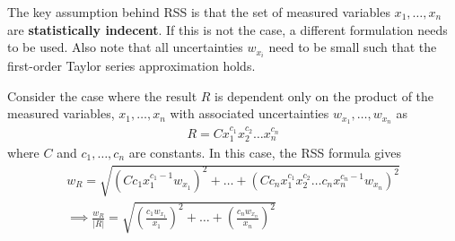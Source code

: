 The key assumption behind RSS is that the set of measured variables $x_1, \ldots, x_n$ are \textbf{statistically indecent}. If this is not the case, a different formulation needs to be used. Also note that all uncertainties $w_{x_i}$ need to be small such that the first-order Taylor series approximation holds. 

Consider the case where the result $R$ is dependent only on the product of the measured variables, $x_1, \ldots, x_n$ with associated uncertainties $w_{x_1}, \ldots, w_{x_n}$ as 
\begin{align*}
    R = C x_{1}^{c_1} x_{2}^{c_2} \ldots x_{n}^{c_n}
\end{align*}
where $C$ and $c_1, \ldots, c_n$ are constants. In this case, the RSS formula gives
\begin{align}
    w_{R} = \sqrt{\left(C c_1 x_{1}^{c_1 - 1} w_{x_1}\right)^2 + \ldots + \left(C c_n x_{1}^{c_1} x_{2}^{c_2} \ldots c_n x_{n}^{c_n - 1} w_{x_n}\right)^2} \nonumber \\
    \implies \frac{w_{R}}{|R|} = \sqrt{\left(\frac{c_1 w_{x_1}}{x_1}\right)^2 + \ldots + \left(\frac{c_n w_{x_n}}{x_n}\right)^2} \label{eq:error_propagation_pure_multiplicative}
\end{align}

